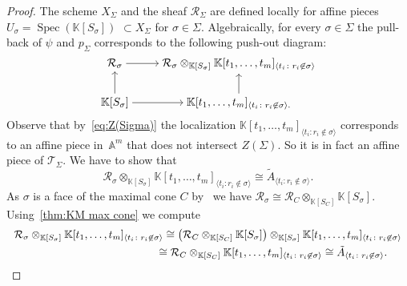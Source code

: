 \documentclass[10pt,a4paper]{amsart}
\newcommand{\thref}[1]{\ref{#1}}
\numberwithin{equation}{section}
\begin{document}
\begin{proof}
The scheme $X_\Sigma$ and the sheaf $\mathcal R_\Sigma$ are defined locally for affine pieces $U_\sigma=\operatorname{Spec}(\mathbb K[S_\sigma])$ $\subset X_\Sigma$ for $\sigma\in \Sigma$.
Algebraically, for every $\sigma\in \Sigma$ the pull-back of $\psi$ and $p_\Sigma$ corresponds to the following push-out diagram:
 \begin{equation*}%
 \begin{tikzcd}[ampersand replacement=\&,cramped]
 \mathcal R_\sigma\ar[r] \&
 \mathcal R_\sigma\otimes_{\mathbb K[S_\sigma]}\mathbb K[t_1,\dots,t_m]_{\langle t_i\colon r_i\not\in \sigma\rangle } \\
 \mathbb K[S_\sigma] \ar[r]\ar[u]\& \mathbb K[t_1,\dots,t_m]_{\langle t_i\colon r_i\not\in \sigma\rangle . } \ar[u]
 \end{tikzcd}
 \end{equation*}
Observe that by~\eqref{eq:Z(Sigma)} the localization $\mathbb K[t_1,\dots,t_m]_{\langle t_i\colon r_i\not\in \sigma\rangle }$ corresponds to an affine piece in~$\mathbb A^m$ that does not intersect $Z(\Sigma)$.
So it is in fact an affine piece of $\mathcal T_\Sigma$.
We have to show that
\begin{displaymath}
\mathcal R_\sigma\otimes_{\mathbb K[S_\sigma]}\mathbb K[t_1,\dots,t_m]_{\langle t_i\colon r_i\not\in \sigma\rangle } \cong \tilde A_{\langle t_i\colon r_i\not\in \sigma\rangle}.
\end{displaymath}
As $\sigma$ is a face of the maximal cone $C$ by~\cite[Proposition 3.13]{KM-toricbundles} we have $\mathcal R_\sigma\cong \mathcal R_C\otimes_{\mathbb K[S_C]}\mathbb K[S_\sigma]$.
Using~\thref{thm:KM max cone} we compute
\begin{gather*}
\mathcal R_\sigma\otimes_{\mathbb K[S_\sigma]}\mathbb K[t_1,\dots,t_m]_{\langle t_i\colon r_i\not\in \sigma\rangle}
\cong
\big(\mathcal R_C\otimes_{\mathbb K[S_C]}\mathbb K[S_\sigma]\big)\otimes_{\mathbb K[S_\sigma]}\mathbb K[t_1,\dots,t_m]_{\langle t_i\colon r_i\not\in \sigma\rangle}
\\ \hphantom{\mathcal R_\sigma\otimes_{\mathbb K[S_\sigma]}\mathbb K[t_1,\dots,t_m]_{\langle t_i\colon r_i\not\in \sigma\rangle}}
{}\cong\mathcal R_C\otimes_{\mathbb K[S_C]}\mathbb K[t_1,\dots,t_m]_{\langle t_i\colon r_i\not\in \sigma\rangle}\cong \tilde A_{\langle t_i\colon r_i\not\in \sigma\rangle}.\tag*{\qed}
\end{gather*}
\renewcommand{\qed}{}
\end{proof}
\end{document}
